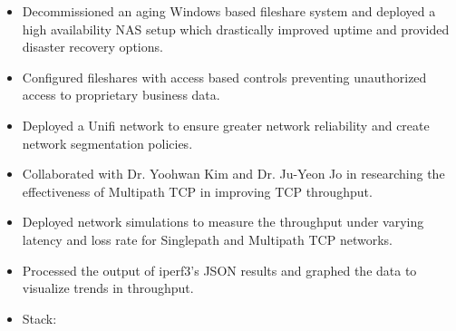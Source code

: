 \begin{itemize}
    \item Decommissioned an aging Windows based fileshare system and deployed a high availability NAS setup which drastically improved uptime and provided disaster recovery options.
    \item Configured fileshares with access based controls preventing unauthorized access to proprietary business data.
    \item Deployed a Unifi network to ensure greater network reliability and create network segmentation policies.
   \end{itemize}
\divider


\begin{itemize}
    \item Collaborated with Dr. Yoohwan Kim and Dr. Ju-Yeon Jo in researching the effectiveness of Multipath TCP in improving TCP throughput.
    \item Deployed network simulations to measure the throughput under varying latency and loss rate for Singlepath and Multipath TCP networks.
    \item Processed the output of iperf3's JSON results and graphed the data to visualize trends in throughput.
    \item Stack:    
\end{itemize}
\divider


